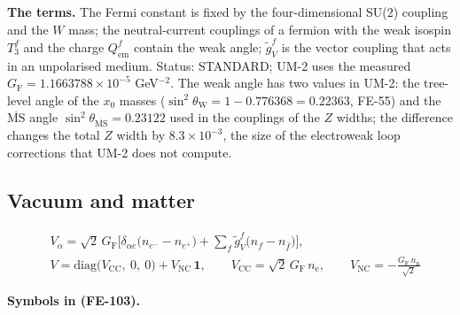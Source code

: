 \documentclass[
  10pt,
]{article}
\begin{document}
\textbf{The terms.} The Fermi constant is fixed by the four-dimensional
SU(2) coupling and the \(W\) mass; the neutral-current couplings of a
fermion with the weak isospin \(T_3^f\) and the charge
\(Q_{\mathrm{em}}^f\) contain the weak angle; \(\tilde g^f_V\) is the
vector coupling that acts in an unpolarised medium. Status: STANDARD;
UM-2 uses the measured \(G_{\mathrm{F}} = 1.1663788\times10^{-5}\)
GeV\(^{-2}\). The weak angle has two values in UM-2: the tree-level
angle of the \(x_0\) masses
(\(\sin^2\theta_{\mathrm{W}} = 1 - 0.776368 = 0.22363\), FE-55) and the
\(\overline{\mathrm{MS}}\) angle
\(\sin^2\theta_{\overline{\mathrm{MS}}} = 0.23122\) used in the
couplings of the \(Z\) widths; the difference changes the total \(Z\)
width by \(8.3\times10^{-3}\), the size of the electroweak loop
corrections that UM-2 does not compute.

\hypertarget{vacuum-and-matter}{%
\subsection{Vacuum and matter}\label{vacuum-and-matter}}

\[
\begin{aligned}
&V_\alpha = \sqrt2\,G_{\mathrm{F}}\Big[\delta_{\alpha e}\big(n_{e^-} - n_{e^+}\big) + \sum_f\tilde
 g^f_V\big(n_f - n_{\bar f}\big)\Big],\\
&V = \mathrm{diag}\big(V_{\mathrm{CC}},\ 0,\ 0\big) + V_{\mathrm{NC}}\,\mathbf{1},\qquad V_{\mathrm{CC}}
 = \sqrt2\,G_{\mathrm{F}}\,n_{\mathrm{e}},
 \qquad V_{\mathrm{NC}} = -\frac{G_{\mathrm{F}}\,n_{\mathrm{n}}}{\sqrt2}
\end{aligned} \tag{FE-103}
\]

\textbf{Symbols in (FE-103).}
\end{document}
